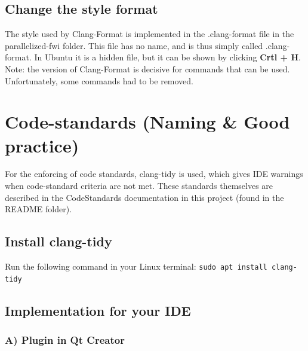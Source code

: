 \documentclass[10pt]{article}
\begin{document}
\subsection*{Change the style format}
The style used by Clang-Format is implemented in the .clang-format file in the parallelized-fwi folder. This file has no name, and is thus simply called .clang-format. In Ubuntu it is a hidden file, but it can be shown by clicking \textbf{Crtl + H}. Note: the version of Clang-Format is decisive for commands that can be used. Unfortunately, some commands had to be removed.
\newpage

\section{Code-standards (Naming \& Good practice)}
For the enforcing of code standards, clang-tidy is used, which gives IDE warnings when code-standard criteria are not met. These standards themselves are described in the CodeStandards documentation in this project (found in the README folder).

\subsection*{Install clang-tidy}
Run the following command in your Linux terminal: \texttt{sudo apt install clang-tidy}

\subsection*{Implementation for your IDE}
\subsubsection*{A) Plugin in Qt Creator}
\end{document}
